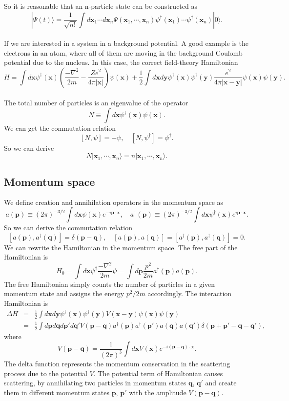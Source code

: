 So it is reasonable that  an n-particle state can be constructed as
\[|\Psi(t)\rangle = \frac{1}{\sqrt{n!}} \int d\bm{x}_1 \cdots d\bm{x}_n \Psi(\bm{x}_1,\cdots,\bm{x}_n) \psi^{\dagger}(\bm{x}_1)\cdots\psi^{\dagger}(\bm{x}_n)|0\rangle.\]
\\
If we are interested in a system in a background potential.  
A good example is the electrons in an atom, where all of them are moving in the background Coulomb potential due to the nucleus. In this case, the correct field-theory Hamiltonian
\[H = \int d\bm{x} \psi^{\dagger}(\bm{x}) \left(\frac{-\nabla^2}{2m} - \frac{Ze^2}{4\pi |\bm{x}|} \right)\psi(\bm{x}) + \frac{1}{2}\int d\bm{x} d\bm{y} \psi^{\dagger}(\bm{x}) \psi^{\dagger}(\bm{y}) \frac{e^2}{4\pi|\bm{x}-\bm{y}|} \psi(\bm{x})\psi(\bm{y}).\]
\\
The total number of particles is an eigenvalue of the operator
\[N \equiv \int d\bm{x} \psi^{\dagger}(\bm{x})\psi(\bm{x}).\]
We can get the commutation relation
\[[N,\psi] = -\psi , \quad [N,\psi^{\dagger}] = \psi^{\dagger}.\]
So we can derive
\[N|\bm{x}_1,\cdots,\bm{x}_n\rangle = n|\bm{x}_1,\cdots,\bm{x}_n\rangle.\]

\subsection{Momentum space}
We define creation and annihilation operators in the
momentum space as
\[a(\bm{p}) \equiv (2\pi)^{-3/2}\int d\bm{x} \psi(\bm{x}) e^{-i\bm{p}\cdot\bm{x}} , \quad a^{\dagger}(\bm{p}) \equiv  (2\pi)^{-3/2} \int d\bm{x} \psi^{\dagger}(\bm{x}) e^{i\bm{p}\cdot\bm{x}}.\]
So we can derive the commutation relation
\[[a(\bm{p}),a^{\dagger}(\bm{q})] = \delta(\bm{p}-\bm{q}) , \quad [a(\bm{p}),a(\bm{q})] = [a^{\dagger}(\bm{p}),a^{\dagger}(\bm{q})] = 0.\]
We can rewrite the Hamiltonian in the momentum space. The
free part of the Hamiltonian is
\[H_0 = \int d\bm{x} \psi^{\dagger} \frac{-\nabla^2}{2m} \psi = \int d\bm{p} \frac{p^2}{2m} a^{\dagger}(\bm{p})a(\bm{p}).\]
The free Hamiltonian simply counts the number of particles in a given momentum state and assigns the energy ${p^2}/{2m}$ accordingly.
The interaction Hamiltonian is
\begin{eqnarray}
\Delta H &=& \frac{1}{2}\int d\bm{x} d\bm{y} \psi^{\dagger}(\bm{x}) \psi^{\dagger}(\bm{y}) V(\bm{x} - \bm{y}) \psi(\bm{x})\psi(\bm{y})  \nonumber \\
&=& \frac{1}{2} \int d\bm{p}d\bm{q}d\bm{p}'d\bm{q}' V(\bm{p}-\bm{q}) a^{\dagger}(\bm{p}) a^{\dagger}(\bm{p}') a(\bm{q}) a(\bm{q}') \delta(\bm{p}+\bm{p}'-\bm{q}-\bm{q}'),\nonumber
\end{eqnarray}
where
\[V(\bm{p}-\bm{q}) = \frac{1}{(2\pi)^3} \int d\bm{x} V(\bm{x}) e^{-i(\bm{p}-\bm{q})\cdot\bm{x}}.\]
The delta function represents the momentum conservation in the scattering process due to the potential $V$. The potential term of Hamiltonian causes scattering, by annihilating two particles in momentum states $\bm{q}$, $\bm{q}'$ and create them in different momentum states $\bm{p}$, $\bm{p}'$ with the amplitude
$V(\bm{p}-\bm{q})$.

